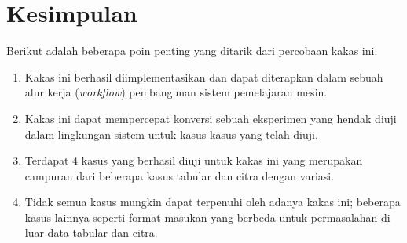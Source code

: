 \section{Kesimpulan}

Berikut adalah beberapa poin penting yang ditarik dari percobaan kakas ini.

\begin{enumerate}
    \item Kakas ini berhasil diimplementasikan dan dapat diterapkan dalam sebuah alur kerja (\textit{workflow}) pembangunan sistem pemelajaran mesin.
    \item Kakas ini dapat mempercepat konversi sebuah eksperimen yang hendak diuji dalam lingkungan sistem untuk kasus-kasus yang telah diuji.
    \item Terdapat 4 kasus yang berhasil diuji untuk kakas ini yang merupakan campuran dari beberapa kasus tabular dan citra dengan variasi.
    \item Tidak semua kasus mungkin dapat terpenuhi oleh adanya kakas ini; beberapa kasus lainnya seperti format masukan yang berbeda untuk permasalahan di luar data tabular dan citra.
\end{enumerate}

